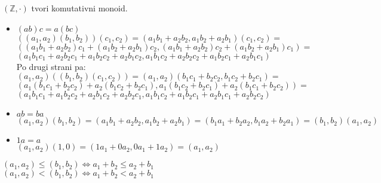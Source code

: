\begin{trditev}
    $(\mathbb{Z}, \cdot)$ tvori komutativni monoid.
\end{trditev}
\begin{dokaz}
    \begin{itemize}
        \item $(ab)c = a(bc)$\\
        $((a_1,a_2)(b_1,b_2))(c_1,c_2) = (a_1 b_1 + a_2 b_2, a_1 b_2 + a_2 b_1)(c_1, c_2) = $\\
        $((a_1 b_1 + a_2 b_2)c_1 + (a_1 b_2 + a_2 b_1)c_2, (a_1 b_1 + a_2 b_2)c_2 + (a_1 b_2 + a_2 b_1)c_1) = $\\
        $(a_1 b_1 c_1 + a_2 b_2 c_1 + a_1 b_2 c_2 + a_2 b_1 c_2, a_1 b_1 c_2 + a_2 b_2 c_2 + a_1 b_2 c_1 + a_2 b_1 c_1)$ \\
        Po drugi strani pa:\\
        $(a_1,a_2)((b_1,b_2)(c_1,c_2)) = (a_1,a_2)(b_1 c_1 + b_2 c_2, b_1 c_2 + b_2 c_1) =$\\
        $(a_1(b_1 c_1 + b_2 c_2) + a_2(b_1 c_2 + b_2 c_1), a_1(b_1 c_2 + b_2 c_1) + a_2(b_1 c_1 + b_2 c_2)) =$\\
        $(a_1 b_1 c_1 + a_1 b_2 c_2 + a_2 b_1 c_2 + a_2 b_2 c_1, a_1 b_1 c_2 + a_1 b_2 c_1 + a_2 b_1 c_1 + a_2 b_2 c_2)$
        \item $ab = ba$\\
        $(a_1, a_2)(b_1, b_2) = (a_1 b_1 + a_2 b_2, a_1 b_2 + a_2 b_1) = (b_1 a_1 + b_2 a_2, b_1 a_2 + b_2 a_1) = (b_1, b_2)(a_1, a_2)$
        \item $1a = a$\\
        $(a_1, a_2)(1, 0) = (1 a_1 + 0 a_2, 0 a_1 + 1 a_2) = (a_1, a_2)$
    \end{itemize}
\end{dokaz}

\begin{definicija}
    $(a_1, a_2) \leq (b_1, b_2) \iff a_1 + b_2 \leq a_2 + b_1$ \\
    $(a_1, a_2) < (b_1, b_2) \iff a_1 + b_2 < a_2 + b_1$
\end{definicija}

